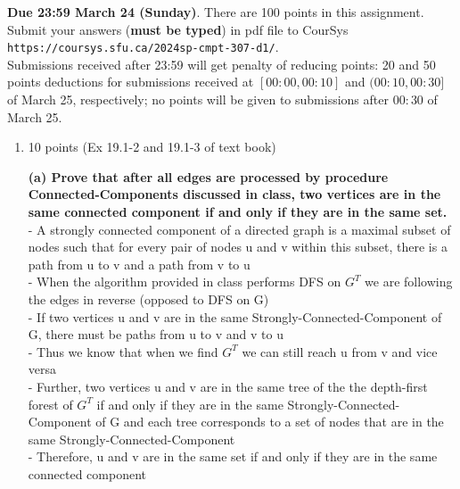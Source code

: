 \documentclass[letterpaper,12pt]{article}
\begin{document}

\pagestyle{myheadings}

\noindent
{\bf Due 23:59 March 24 (Sunday)}. There are 100 points in this assignment. \\
Submit your answers ({\bf must be typed}) in pdf file to CourSys\\
{\tt https://coursys.sfu.ca/2024sp-cmpt-307-d1/}.\\
Submissions received after 23:59 will get penalty of reducing points: 20 and 50 points
deductions for submissions received at $[00:00,00:10]$ and $(00:10,00:30]$ of March 25,
respectively; no points will be given to submissions after $00:30$ of March 25.

\begin{enumerate}
\item 10 points (Ex 19.1-2 and 19.1-3 of text book)

\textbf{(a) Prove that after all edges are processed by procedure Connected-Components discussed
in class, two vertices are in the same connected component if and only if they are in the 
same set.} \\
- A strongly connected component of a directed graph is a maximal subset of nodes such that for every pair of nodes u and v within this subset, there is a path from u to v and a path from v to u \\
- When the algorithm provided in class performs DFS on $G^T$ we are following the edges in reverse (opposed to DFS on G) \\
- If two vertices u and v are in the same Strongly-Connected-Component of G, there must be paths from u to v and v to u \\
- Thus we know that when we find $G^T$ we can still reach u from v and vice versa \\
- Further, two vertices u and v are in the same tree of the the depth-first forest of $G^T$ if and only if they are in the same Strongly-Connected-Component of G and each tree corresponds to a set of nodes that are in the same Strongly-Connected-Component \\
- Therefore, u and v are in the same set if and only if they are in the same connected component \\


\end{enumerate}
\end{document}
